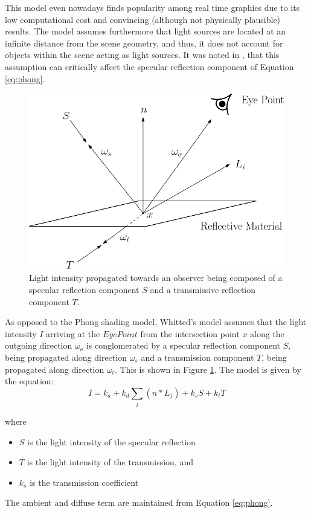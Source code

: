This model even nowadays finds popularity among real time graphics due to its low computational cost and convincing (although not physically plausible) results.
The model assumes furthermore that light sources are located at an infinite distance from the scene geometry, and thus, it does not account for objects within the scene acting as light sources. It was noted in \cite{newell1977progression}, that this assumption can critically affect the specular reflection component of Equation \ref{eq:phong}.

\begin{figure}[h]
	\centering
	\includegraphics[width=.7\linewidth]{img/1 fundamentals/whitted.png}
	\caption{Light intensity propagated towards an observer being composed of a specular reflection component $S$ and a transmissive reflection component $T$.}
	\label{fig:whitted_model}
\end{figure}

As opposed to the Phong shading model, Whitted's model assumes that the light intensity $I$ arriving at the $Eye Point$ from the intersection point $x$ along the outgoing direction $\omega_{o}$ is conglomerated by a specular reflection component $S$, being propagated along direction $\omega_{s}$ and a transmission component $T$, being propagated along direction $\omega_{t}$. This is shown in Figure \ref{fig:whitted_model}.
The model is given by the equation:
\begin{equation} \label{eq:whitted}
I = k_{a} + k_{d}\sum_{j}(n*L_{j}) + k_{s}S + k_{t}T
\end{equation}

\noindent where
\begin{itemize}
	\setlength\itemsep{0.05em}
	\item  $S$ is the light intensity of the specular reflection
	\item  $T$ is the light intensity of the transmission, and
	\item  $k_{s}$ is the transmission coefficient
\end{itemize}
The ambient and diffuse term are maintained from Equation \ref{eq:phong}. 

